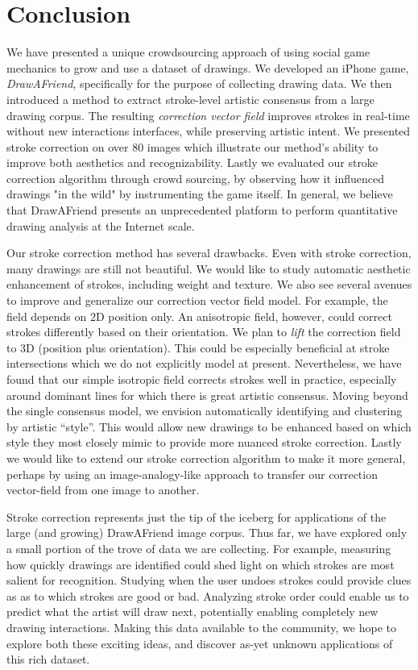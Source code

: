 \section{Conclusion}

We have presented a unique crowdsourcing approach of using social game mechanics to grow and use a dataset of drawings. We developed an iPhone game, \emph{DrawAFriend}, specifically for the purpose of
collecting drawing data. We then introduced a method to extract
stroke-level artistic consensus from a large drawing corpus. The
resulting \emph{correction vector field} improves strokes in
real-time without new interactions interfaces, while preserving artistic
intent. We presented stroke correction on over 80 images which illustrate our method's ability to improve both
aesthetics and recognizability. Lastly we evaluated our stroke correction algorithm through crowd sourcing, by observing how it influenced drawings "in the wild" by instrumenting the game itself. In general, we believe that DrawAFriend presents an unprecedented platform to perform quantitative drawing analysis at the Internet scale.

Our stroke correction method has several drawbacks. Even with stroke
correction, many drawings are still not beautiful. We would like to
study automatic aesthetic enhancement of strokes, including weight
and texture. We also see several avenues to improve and generalize
our correction vector field model. For example, the field depends on
2D position only. An anisotropic field, however, could correct strokes
differently based on their orientation. We plan to {\em lift} the correction field to
3D (position plus orientation). This could be especially
beneficial at stroke intersections which we do not explicitly model
at present. Nevertheless, we have found that our simple isotropic
field corrects strokes well in practice, especially
around dominant lines for which there is great artistic consensus.
Moving beyond the single consensus model, we envision automatically
identifying and clustering by artistic ``style''. This would allow new drawings to
be enhanced based on which style they most closely mimic to provide more
nuanced stroke correction. Lastly we would like to extend our stroke correction algorithm to make it more general, perhaps by using an image-analogy-like approach to transfer our correction vector-field from one image to another.

Stroke correction represents just the tip of the iceberg for
applications of the large (and growing) DrawAFriend image corpus. Thus far, we have explored only a
small portion of the trove of data we are collecting. For example,
measuring how quickly drawings are identified could shed light on
which strokes are most salient for recognition. Studying when the
user undoes strokes could provide clues as as to which strokes are
good or bad. Analyzing stroke order could enable us to predict what
the artist will draw next, potentially enabling completely new
drawing interactions. Making this data available to the community,
we hope to explore both these exciting ideas, and discover as-yet
unknown applications of this rich dataset.

